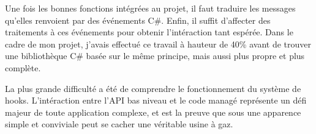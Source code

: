 Une fois les bonnes fonctions intégrées au projet, il faut traduire les messages qu'elles renvoient par des événements C\#. Enfin, il suffit d'affecter des traitements à ces événements pour obtenir l'intéraction tant espérée. Dans le cadre de mon projet, j'avais effectué ce travail à hauteur de 40\% avant de trouver une bibliothèque C\# basée sur le même principe, mais aussi plus propre et plus complète.

La plus grande difficulté a été de comprendre le fonctionnement du système de hooks. L'intéraction entre l'API bas niveau et le code managé représente un défi majeur de toute application complexe, et est la preuve que sous une apparence simple et conviviale peut se cacher une véritable usine à gaz.